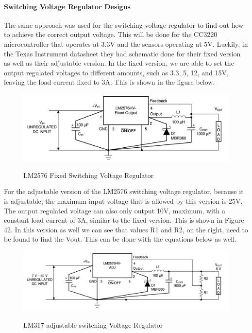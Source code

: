 \paragraph{Switching Voltage Regulator Designs}
The same approach was used for the switching voltage regulator to find out how to achieve the correct output voltage. This will be done for the CC3220 microcontroller that operates at 3.3V and the sensors operating at 5V. Luckily, in the Texas Instrument datasheet they had schematic done for their fixed version as well as their adjustable version. In the fixed version, we are able to set the output regulated voltages to different amounts, such as 3.3, 5, 12, and 15V, leaving the load current fixed to 3A. This is shown in the figure below.\par
\begin{figure}[H]
    \centering
    \caption{LM2576 Fixed Switching Voltage Regulator}
    \includegraphics[width=\textwidth]{images/LM2576_Fixed.png}
    \label{fig:fixed-switching-voltage-regulator}
\end{figure}
For the adjustable version of the LM2576 switching voltage regulator, because it is adjustable, the maximum input voltage that is allowed by this version is 25V. The output regulated voltage can also only output 10V, maximum, with a constant load current of 3A, similar to the fixed version. This is shown in Figure 42. In this version as well we can see that values R1 and R2, on the right, need to be found to find the Vout. This can be done with the equations below as well.\par
\begin{figure}[H]
    \centering
    \caption{LM317 adjustable switching Voltage Regulator}
    \includegraphics[width=\textwidth]{images/LM2576_Adjustable.png}
    \label{fig:5V-linear-voltage-regulator}
\end{figure}


